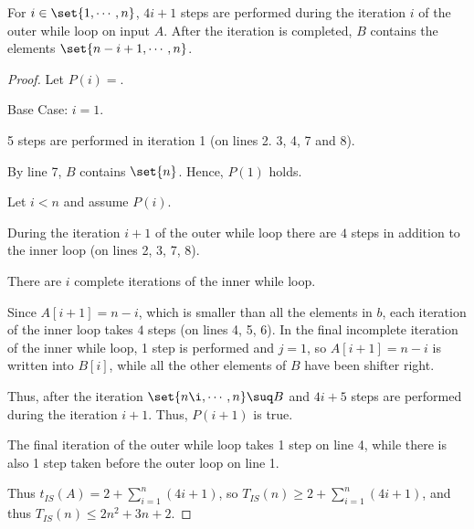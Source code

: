 \documentclass[11pt]{scrartcl}
\begin{document}
\begin{claim*}
  For $i\in\set{1, \cdots, n}$, $4i+1$ steps are performed during the
  iteration $i$ of the outer while loop on input $A$. After the
  iteration is completed, $B$ contains the elements
  $\set{n- i + 1, \cdots, n}$.
\end{claim*}
\begin{proof}
  \hfill

  Let $P(i) =$.

  Base Case:
  $i=1$.

  5 steps are performed in iteration 1 (on lines 2. 3, 4, 7 and 8).

  By line 7,  $B$ contains $\set{n}$. Hence, $P(1)$ holds.

  Let $i< n$ and assume $P(i)$.

  During the iteration $i+1$ of the outer while loop there are $4$ steps in addition to the inner loop (on lines 2, 3, 7, 8).

  There are $i$ complete iterations of the inner while loop.

  Since $A[i+1] = n-i$, which is smaller than all the elements in $b$,
  each iteration of the inner loop takes $4$ steps (on lines 4, 5,
  6). In the final incomplete iteration of the inner while loop, 1
  step is performed and $j=1$, so $A[i+1] = n-i$ is written into
  $B[i]$, while all the other elements of $B$ have been shifter right.

  Thus, after the iteration $\set{n\i, \cdots, n} \suq B$ and $4i+5$
  steps are performed during the iteration $i+1$. Thus, $P(i+1)$ is
  true.

  The final iteration of the outer while loop takes 1 step on line 4,
  while there is also 1 step taken before the outer loop on line 1.

  Thus $t_{IS}(A) = 2+ \sum_{i=1}^n(4i+1)$, so
  $T_{IS}(n) \geq 2+\sum_{i=1}^n(4i+1)$, and thus
  $T_{IS}(n) \leq 2n^2+3n+2$.

  

\end{proof}
\end{document}
